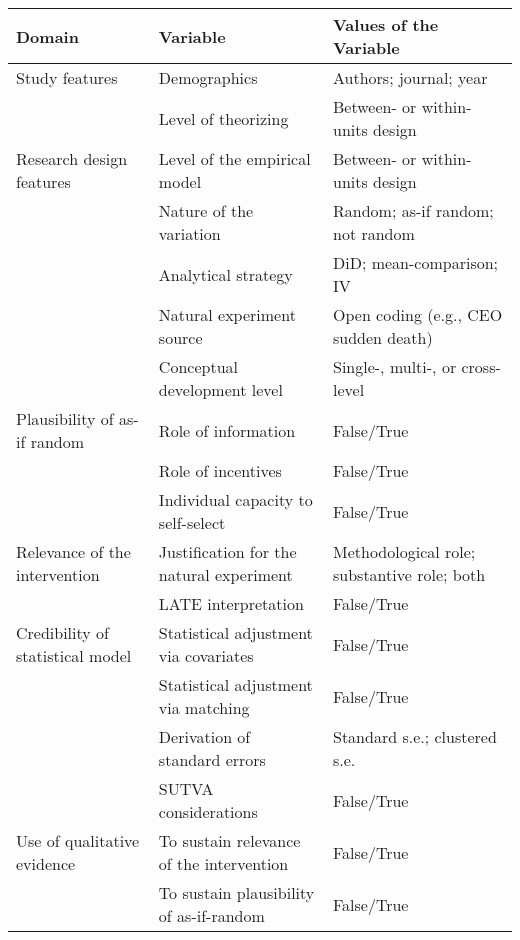 \begin{tabular}{p{4.5cm} p{5.5cm} p{5.5cm}}
\toprule \toprule
    Domain & Variable & Values of the Variable \\ \midrule
    Study features \dotfill & Demographics & Authors; journal; year \\ 
     & Level of theorizing & Between- or within-units design \\ 
    Research design features \dotfill & Level of the empirical model & Between- or within-units design \\ \
     & Nature of the variation & Random; as-if random; not random \\ 
     & Analytical strategy & DiD; mean-comparison; IV \\ 
     & Natural experiment source & Open coding (e.g., CEO sudden death) \\ 
     & Conceptual development level & Single-, multi-, or cross-level \\ 
     Plausibility of as-if random\dotfill & Role of information & False/True \\ 
     & Role of incentives & False/True \\ 
     & Individual capacity to self-select & False/True \\ 
    Relevance of the intervention \dotfill& Justification for the natural experiment & Methodological role; substantive role; both \\ 
    & LATE interpretation & False/True \\
    Credibility of statistical model \dotfill & Statistical adjustment via covariates & False/True \\ 
     & Statistical adjustment via matching & False/True \\ 
     & Derivation of standard errors & Standard s.e.; clustered s.e. \\ 
     & SUTVA considerations & False/True \\
    Use of qualitative evidence \dotfill & To sustain relevance of the intervention & False/True \\ 
     & To sustain plausibility of as-if-random & False/True \\ \bottomrule
\end{tabular}